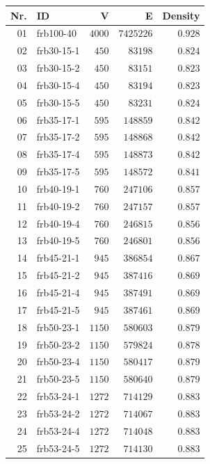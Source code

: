\documentclass[draft,final]{vutinfth} %
\begin{document}
\begin{table}
    \centering
    \begin{tabular}{|r|l|r|r|r|}
        \hline
        \textbf{Nr.} & \textbf{ID} & \textbf{V} & \textbf{E} & \textbf{Density} \\ \hline
        01 & frb100-40 & $4000$ & $7425226$ & $0.928$\\
        02 & frb30-15-1 & $450$ & $83198$ & $0.824$\\
        03 &frb30-15-2 & $450$ & $83151$ & $0.823$\\
        04 &frb30-15-4 & $450$ & $83194$ & $0.823$\\
        05 &frb30-15-5 & $450$ & $83231$ & $0.824$\\
        06 &frb35-17-1 & $595$ & $148859$ & $0.842$\\
        07 &frb35-17-2 & $595$ & $148868$ & $0.842$\\
        08 &frb35-17-4 & $595$ & $148873$ & $0.842$\\
        09 &frb35-17-5 & $595$ & $148572$ & $0.841$\\
        10 &frb40-19-1 & $760$ & $247106$ & $0.857$\\
        11 &frb40-19-2 & $760$ & $247157$ & $0.857$\\
        12 &frb40-19-4 & $760$ & $246815$ & $0.856$\\
        13 &frb40-19-5 & $760$ & $246801$ & $0.856$\\
        14 &frb45-21-1 & $945$ & $386854$ & $0.867$\\
        15 &frb45-21-2 & $945$ & $387416$ & $0.869$\\
        16 &frb45-21-4 & $945$ & $387491$ & $0.869$\\
        17 &frb45-21-5 & $945$ & $387461$ & $0.869$\\
        18 &frb50-23-1 & $1150$ & $580603$ & $0.879$\\
        19 &frb50-23-2 & $1150$ & $579824$ & $0.878$\\
        20 &frb50-23-4 & $1150$ & $580417$ & $0.879$\\
        21 &frb50-23-5 & $1150$ & $580640$ & $0.879$\\
        22 &frb53-24-1 & $1272$ & $714129$ & $0.883$\\
        23 &frb53-24-2 & $1272$ & $714067$ & $0.883$\\
        24 &frb53-24-4 & $1272$ & $714048$ & $0.883$\\
        25 &frb53-24-5 & $1272$ & $714130$ & $0.883$\\

\end{tabular}
\end{table}
\end{document}
